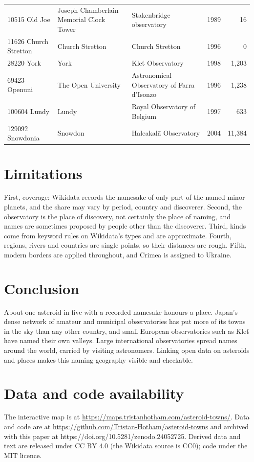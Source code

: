 \documentclass[11pt,a4paper]{article}
\begin{document}
{\begin{longtable}{p{3.4cm}p{4.2cm}p{4.6cm}rr}
10515 Old Joe & Joseph Chamberlain Memorial Clock Tower & Stakenbridge observatory & 1989 & 16\\
11626 Church Stretton & Church Stretton & Church Stretton & 1996 & 0\\
28220 York & York & Kleť Observatory & 1998 & 1,203\\
69423 Openuni & The Open University & Astronomical Observatory of Farra d'Isonzo & 1996 & 1,238\\
100604 Lundy & Lundy & Royal Observatory of Belgium & 1997 & 633\\
129092 Snowdonia & Snowdon & Haleakalā Observatory & 2004 & 11,384\\
\bottomrule\end{longtable}}

\section{Limitations}
First, coverage: Wikidata records the namesake of only part of the named minor planets, and the share may vary by period, country and discoverer. Second, the observatory is the place of discovery, not certainly the place of naming, and names are sometimes proposed by people other than the discoverer. Third, kinds come from keyword rules on Wikidata's types and are approximate. Fourth, regions, rivers and countries are single points, so their distances are rough. Fifth, modern borders are applied throughout, and Crimea is assigned to Ukraine.

\section{Conclusion}
About one asteroid in five with a recorded namesake honours a place. Japan's dense network of amateur and municipal observatories has put more of its towns in the sky than any other country, and small European observatories such as Kle\v{t} have named their own valleys. Large international observatories spread names around the world, carried by visiting astronomers. Linking open data on asteroids and places makes this naming geography visible and checkable.

\section*{Data and code availability}
The interactive map is at \url{https://maps.tristanhotham.com/asteroid-towns/}. Data and code are at \url{https://github.com/Tristan-Hotham/asteroid-towns} and archived with this paper at https://doi.org/10.5281/zenodo.24052725. Derived data and text are released under CC BY 4.0 (the Wikidata source is CC0); code under the MIT licence.
\end{document}
